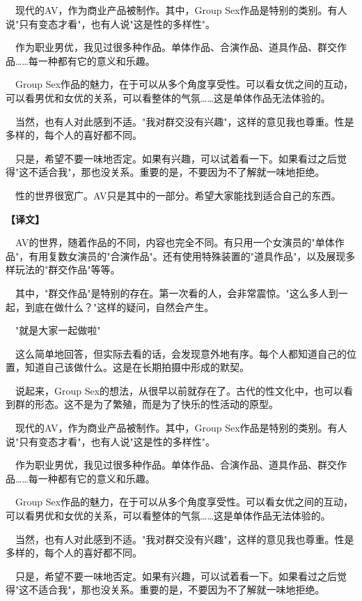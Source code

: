 \documentclass[12pt,UTF8]{ctexbook}
\begin{document}
{{　现代的AV，作为商业产品被制作。其中，Group Sex作品是特别的类别。有人说"只有变态才看"，也有人说"这是性的多样性"。

　作为职业男优，我见过很多种作品。单体作品、合演作品、道具作品、群交作品……每一种都有它的意义和乐趣。

　Group Sex作品的魅力，在于可以从多个角度享受性。可以看女优之间的互动，可以看男优和女优的关系，可以看整体的气氛……这是单体作品无法体验的。

　当然，也有人对此感到不适。"我对群交没有兴趣"，这样的意见我也尊重。性是多样的，每个人的喜好都不同。

　只是，希望不要一味地否定。如果有兴趣，可以试着看一下。如果看过之后觉得"这不适合我"，那也没关系。重要的是，不要因为不了解就一味地拒绝。

　性的世界很宽广。AV只是其中的一部分。希望大家能找到适合自己的东西。
}

\vspace{2ex}
\parbox{0.9\linewidth}{
\textbf{【译文】}\par

　AV的世界，随着作品的不同，内容也完全不同。有只用一个女演员的"单体作品"，有用复数女演员的"合演作品"。还有使用特殊装置的"道具作品"，以及展现多样玩法的"群交作品"等等。

　其中，"群交作品"是特别的存在。第一次看的人，会非常震惊。"这么多人到一起，到底在做什么？"这样的疑问，自然会产生。

　"就是大家一起做啦"

　这么简单地回答，但实际去看的话，会发现意外地有序。每个人都知道自己的位置，知道自己该做什么。这是在长期拍摄中形成的默契。

　说起来，Group Sex的想法，从很早以前就存在了。古代的性文化中，也可以看到群的形态。这不是为了繁殖，而是为了快乐的性活动的原型。

　现代的AV，作为商业产品被制作。其中，Group Sex作品是特别的类别。有人说"只有变态才看"，也有人说"这是性的多样性"。

　作为职业男优，我见过很多种作品。单体作品、合演作品、道具作品、群交作品……每一种都有它的意义和乐趣。

　Group Sex作品的魅力，在于可以从多个角度享受性。可以看女优之间的互动，可以看男优和女优的关系，可以看整体的气氛……这是单体作品无法体验的。

　当然，也有人对此感到不适。"我对群交没有兴趣"，这样的意见我也尊重。性是多样的，每个人的喜好都不同。

　只是，希望不要一味地否定。如果有兴趣，可以试着看一下。如果看过之后觉得"这不适合我"，那也没关系。重要的是，不要因为不了解就一味地拒绝。

}}
\end{document}
